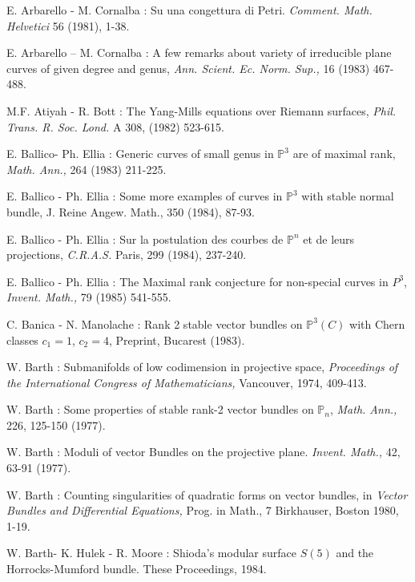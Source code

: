 \begin{thebibliography}{}
 E. Arbarello - M. Cornalba : Su una congettura di
Petri. {\em Comment. Math. Helvetici} 56 (1981), 1-38. 

 E. Arbarello -- M. Cornalba : A few remarks about variety of irreducible plane curves of given degree and genus, {\em Ann. Scient. Ec. Norm. Sup.,} 16 (1983) 467-488.

 M.F. Atiyah - R. Bott : The Yang-Mills equations over Riemann surfaces, {\em Phil. Trans. R. Soc. Lond.} A 308, (1982) 523-615.

 E. Ballico\pageoriginale - Ph. Ellia : Generic curves of small genus in $\mathbb{P}^{3}$ are of maximal rank, {\em Math. Ann.,} 264 (1983) 211-225.

 E. Ballico - Ph. Ellia : Some more examples of curves in $\mathbb{P}^{3}$ with stable normal bundle, {\rm J. Reine Angew. Math.,} 350 (1984), 87-93.

 E. Ballico - Ph. Ellia : Sur la postulation des courbes de $\mathbb{P}^{n}$ et de leurs projections, {\em C.R.A.S.} Paris, 299 (1984), 237-240.

 E. Ballico - Ph. Ellia : The Maximal rank conjecture for non-special curves in $P^{3}$, {\em Invent. Math.,} 79 (1985) 541-555.

 C. Banica - N. Manolache : Rank 2 stable vector bundles on $\mathbb{P}^{3}(C)$ with Chern classes $c_{1}=1$, $c_{2}=4$, Preprint, Bucarest (1983). 

 W. Barth : Submanifolds of low codimension in projective space, {\em Proceedings of the International Congress of Mathematicians,} Vancouver, 1974, 409-413.

 W. Barth : Some properties of stable rank-2 vector bundles on $\mathbb{P}_{n}$, {\em Math. Ann.,} 226, 125-150 (1977).

 W. Barth : Moduli of vector Bundles on the projective plane. {\em Invent. Math.,} 42, 63-91 (1977).

 W. Barth : Counting singularities of quadratic forms on vector bundles, in {\em Vector Bundles and Differential Equations,} Prog. in Math., 7 Birkhauser, Boston 1980, 1-19.

 W. Barth\pageoriginale - K. Hulek - R. Moore : Shioda's modular surface $S(5)$ and the Horrocks-Mumford bundle. These Proceedings, 1984.  


\end{thebibliography}
